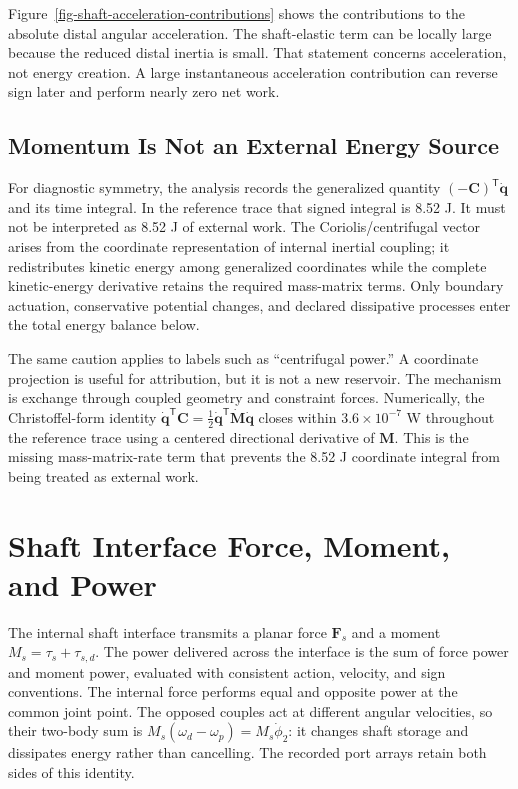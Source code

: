 \documentclass[
  letterpaper,
]{report}
\begin{document}
Figure~\ref{fig-shaft-acceleration-contributions} shows the
contributions to the absolute distal angular acceleration. The
shaft-elastic term can be locally large because the reduced distal
inertia is small. That statement concerns acceleration, not energy
creation. A large instantaneous acceleration contribution can reverse
sign later and perform nearly zero net work.

\subsection{Momentum Is Not an External Energy
Source}\label{sec-shaft-momentum-work}

For diagnostic symmetry, the analysis records the generalized quantity
\((-\mathbf C)^\mathsf T\dot{\mathbf q}\) and its time integral. In the
reference trace that signed integral is 8.52 J. It must not be
interpreted as 8.52 J of external work. The Coriolis/centrifugal vector
arises from the coordinate representation of internal inertial coupling;
it redistributes kinetic energy among generalized coordinates while the
complete kinetic-energy derivative retains the required mass-matrix
terms. Only boundary actuation, conservative potential changes, and
declared dissipative processes enter the total energy balance below.

The same caution applies to labels such as ``centrifugal power.'' A
coordinate projection is useful for attribution, but it is not a new
reservoir. The mechanism is exchange through coupled geometry and
constraint forces. Numerically, the Christoffel-form identity
\(\dot{\mathbf q}^{\mathsf T}\mathbf C
=\tfrac12\dot{\mathbf q}^{\mathsf T}\dot{\mathbf M}\dot{\mathbf q}\)
closes within \(3.6\times10^{-7}\) W throughout the reference trace
using a centered directional derivative of \(\mathbf M\). This is the
missing mass-matrix-rate term that prevents the 8.52 J coordinate
integral from being treated as external work.

\section{Shaft Interface Force, Moment, and
Power}\label{sec-shaft-interface}

The internal shaft interface transmits a planar force \(\mathbf F_s\)
and a moment \(M_s=\tau_s+\tau_{s,d}\). The power delivered across the
interface is the sum of force power and moment power, evaluated with
consistent action, velocity, and sign conventions. The internal force
performs equal and opposite power at the common joint point. The opposed
couples act at different angular velocities, so their two-body sum is
\(M_s(\omega_d-\omega_p)=M_s\dot\phi_2\): it changes shaft storage and
dissipates energy rather than cancelling. The recorded port arrays
retain both sides of this identity.
\end{document}
